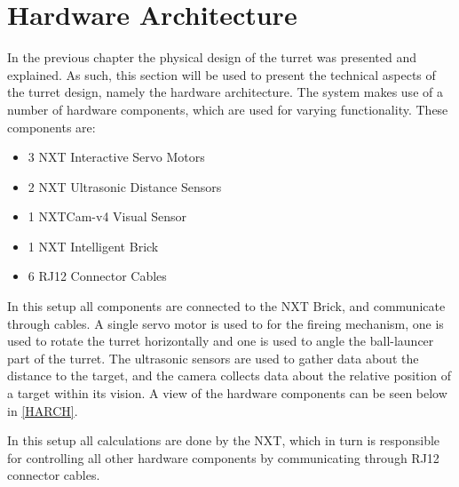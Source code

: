 \section{Hardware Architecture}
In the previous chapter the physical design of the turret was presented and
explained. As such, this section will be used to present the technical aspects
of the turret design, namely the hardware architecture. The \name system makes
use of a number of hardware components, which are used for varying
functionality. These components are:

\begin{itemize}
  \item 3 NXT Interactive Servo Motors
  \item 2 NXT Ultrasonic Distance Sensors
  \item 1 NXTCam-v4 Visual Sensor
  \item 1 NXT Intelligent Brick
  \item 6 RJ12 Connector Cables
\end{itemize}

In this setup all components are connected to the NXT Brick, and communicate
through cables. A single servo motor is used to for the fireing mechanism, one
is used to rotate the turret horizontally and one is used to angle the
ball-launcer part of the turret. The ultrasonic sensors are used to gather data
about the distance to the target, and the camera collects data about the
relative position of a target within its vision. A view of the hardware
components can be seen below in \autoref{HARCH}.


In this setup all calculations are done by the NXT, which in turn is responsible
for controlling all other hardware components by communicating through RJ12
connector cables.
